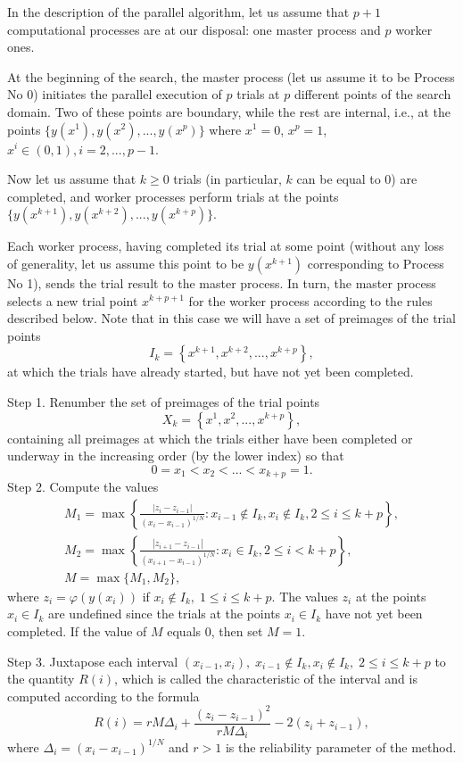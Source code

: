 \documentclass{svproc}
\begin{document}
In the description of the parallel algorithm, let us assume that $p+1$ computational processes are at our disposal: one master process and $p$ worker ones.
 
At the beginning of the search, the master process (let us assume it to be Process No 0) initiates the parallel execution of $p$ trials at $p$ different points of the search domain. 
Two of these points are boundary, while the rest are internal, i.e., at the points $\{y(x^1), y(x^2), ...,y(x^p)\}$ where 
$x^1 = 0$, $x^p = 1$, $x^i\in(0,1), i=2,..., p-1$.

Now let us assume that $k\geq 0$ trials (in particular, $k$ can be equal to 0) are completed, and worker processes perform trials at the points $\{y(x^{k+1}), y(x^{k+2}), ...,y(x^{k+p})\}$. 

Each worker process, having completed its trial at some point (without any loss of generality, let us assume this point to be $y(x^{k+1})$ corresponding to Process No 1), sends the trial result to the master process. 
In turn, the master process selects a new trial point $x^{k+p+1}$ for the worker process according to the rules described below.
Note that in this case we will have a set of preimages of the trial points
\[
I_k = \left\{ x^{k+1},x^{k+2},...,x^{k+p} \right\},
\]
at which the trials have already started, but have not yet been completed.

Step 1. Renumber the set of preimages of the trial points 
\[
X_k = \left\{x^1, x^2,...,x^{k+p} \right\},
\]
containing all preimages at which the trials either have been completed or underway in the increasing order (by the lower index) so that
\[
0=x_1<x_2<...<x_{k+p}=1.
\]
Step 2. Compute the values 
\begin{gather*}
M_1=\max \left\{ \frac{ \left|z_i - z_{i-1} \right|}{(x_i-x_{i-1})^{1/N}} : x_{i-1} \notin I_k, x_i \notin I_k, 2\leq i\leq k+p \right\},\\
M_2=\max \left\{ \frac{ \left|z_{i+1} - z_{i-1} \right|}{(x_{i+1}-x_{i-1})^{1/N}} : x_i \in I_k, 2\leq i < k+p \right\},\\
M=\max\{M_1,M_2\},
\end{gather*}
where $z_i=\varphi(y(x_i))$ if $x_i \notin I_k, \; 1\leq i \leq k+p$. The values $z_i$ at the points $x_i \in I_k$ are undefined since the trials at the points $x_i \in I_k$ have not yet been completed. If the value of $M$ equals 0, then set $M=1$.

Step 3. Juxtapose each interval $(x_{i-1},x_i), \; x_{i-1} \notin I_k, x_i \notin I_k, \; 2\leq i\leq k+p$ to the quantity $R(i)$, which is called the characteristic of the interval and is computed according to the formula
\begin{equation}\label{R}
R(i)=rM\Delta_i+\frac{(z_i-z_{i-1})^2}{rM\Delta_i}-2(z_i+z_{i-1}),
\end{equation}
where $\Delta_i=\left(x_i-x_{i-1}\right)^{1/N}$ and $r>1$ is the reliability parameter of the method.
\end{document}
